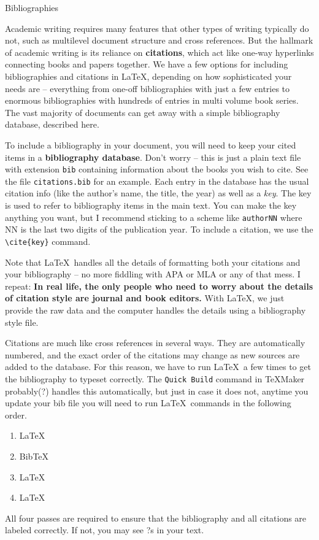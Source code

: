 \documentclass{article}
\begin{document}
\begin{center}
\Large Bibliographies
\end{center}

Academic writing requires many features that other types of writing typically do not, such as multilevel document structure and cross references. But the hallmark of academic writing is its reliance on \textbf{citations}, which act like one-way hyperlinks connecting books and papers together. We have a few options for including bibliographies and citations in \LaTeX, depending on how sophisticated your needs are -- everything from one-off bibliographies with just a few entries to enormous bibliographies with hundreds of entries in multi volume book series. The vast majority of documents can get away with a simple bibliography database, described here.

To include a bibliography in your document, you will need to keep your cited items in a \textbf{bibliography database}. Don't worry -- this is just a plain text file with extension \verb|bib| containing information about the books you wish to cite. See the file \verb|citations.bib| for an example. Each entry in the database has the usual citation info (like the author's name, the title, the year) as well as a \emph{key}. The key is used to refer to bibliography items in the main text. You can make the key anything you want, but I recommend sticking to a scheme like \texttt{authorNN} where NN is the last two digits of the publication year. To include a citation, we use the \verb|\cite{key}| command. \cite{fakename03}

Note that \LaTeX\ handles all the details of formatting both your citations and your bibliography -- no more fiddling with APA or MLA or any of that mess. I repeat: \textbf{In real life, the only people who need to worry about the details of citation style are journal and book editors.} \cite{lasname05} With \LaTeX, we just provide the raw data and the computer handles the details using a bibliography style file.

Citations are much like cross references in several ways. They are automatically numbered, and the exact order of the citations may change as new sources are added to the database. For this reason, we have to run \LaTeX\ a few times to get the bibliography to typeset correctly. The \texttt{Quick Build} command in \TeX{}Maker probably(?) handles this automatically, but just in case it does not, anytime you update your bib file you will need to run \LaTeX\ commands in the following order.
\begin{enumerate}
\item \LaTeX
\item Bib\TeX
\item \LaTeX
\item \LaTeX
\end{enumerate}
All four passes are required to ensure that the bibliography and all citations are labeled correctly. If not, you may see ?s in your text.



\end{document}
